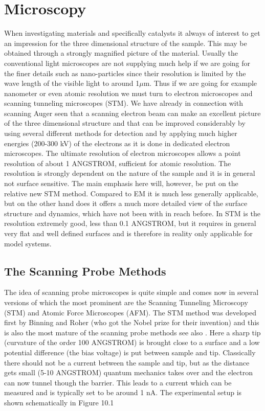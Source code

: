 \newpage
\chapter{Microscopy}
When investigating materials  and specifically catalysts it always of interest to get an impression for the three dimensional structure of the sample. This may be obtained through a strongly magnified picture of the material. Usually the conventional light microscopes are not supplying much help if we are going for the finer details such as nano-particles since  their resolution is limited by the wave length of the visible light to around 1$\mu$m. Thus if we are going for example nanometer or even atomic resolution we must turn to electron microscopes and scanning tunneling microscopes (STM). We have already in connection with scanning Auger seen that a scanning electron beam can make an excellent picture of the  three dimensional structure and that can be improved considerably by using several different methods for detection and by applying much higher energies (200-300 kV) of the electrons as it is done in dedicated electron microscopes. The ultimate resolution of electron microscopes allows a point resolution of about 1 ANGSTROM, sufficient for atomic resolution. The resolution is  strongly dependent on  the nature of the sample and it is in general not surface sensitive. The main emphasis here will, however, be put on the relative new  STM method. Compared to EM it is much less generally applicable, but on the other hand does  it offers a much more detailed view of the surface structure and dynamics, which have not been with in reach before. In STM is the  resolution  extremely good, less than 0.1 ANGSTROM, but it requires in general very flat  and well defined surfaces and is therefore in reality only applicable for model systems.

\section{The Scanning Probe Methods}

The idea of scanning probe microscopes is quite simple and comes now in several versions of which the most prominent are  the Scanning Tunneling Microscopy (STM)  and  Atomic Force Microscopes (AFM). The STM method was developed first by Binning and Roher   \cite{Roher1, Roher2, Roher3} (who got the Nobel prize for their invention) and this is also the most mature of the scanning probe methods see also \cite{STM}. Here a sharp tip (curvature of the order 100 ANGSTROM) is brought close to a surface and a low potential difference (the bias voltage) is put between sample and tip. Classically there should not be a current between the sample and tip, but as the distance gets small (5-10 ANGSTROM)  quantum mechanics takes over and the electron can now tunnel though the barrier. This leads to a current which can be measured and is typically set to be around 1 nA.  The experimental setup is shown schematically in Figure 10.1

